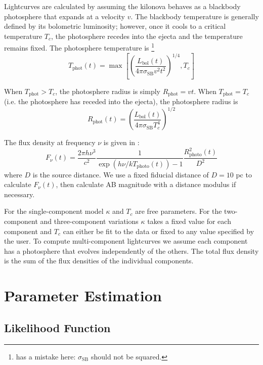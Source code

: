 \documentclass{article}
\begin{document}
Lightcurves are calculated by assuming the kilonova behaves as a blackbody photosphere that expands at a velocity $v$.
The blackbody temperature is generally defined by its bolometric luminosity; however, once it cools to a critical temperature $T_c$, the photosphere recedes into the ejecta and the temperature remains fixed.
The photosphere temperature is
\footnote{\cite{Villar_2017} has a mistake here: $\sigma_\text{SB}$ should not be squared.}
\begin{equation} \label{T_c}
    T_\text{phot}(t) = \max \left [ \left ( \frac {L_\text{bol}(t)} {4 \pi \sigma_\text{SB} v^2 t^2} \right )^{1/4}, T_c \right]
\end{equation}

When $T_\text{phot} > T_c$, the photosphere radius is simply $R_\text{phot} = v t$.
When $T_\text{phot} = T_c$ (i.e. the photosphere has receded into the ejecta), the photosphere radius is
\begin{equation}
    R_\text{phot}(t) = \left ( \frac {L_\text{bol}(t)} {4 \pi \sigma_\text{SB} T_c^4} \right )^{1/2}
\end{equation}

The flux density at frequency $\nu$ is given in \cite{Metzger_2017}:
\begin{equation}
    F_\nu(t) = \frac {2 \pi h \nu^3} {c^2} \frac {1} {\exp{(h \nu / k T_\text{photo}(t))} - 1} \frac {R_\text{photo}^2(t)} {D^2}
\end{equation}
where $D$ is the source distance.
We use a fixed fiducial distance of $D = 10$ pc to calculate $F_\nu(t)$, then calculate AB magnitude with a distance modulus if necessary.

For the single-component model $\kappa$ and $T_c$ are free parameters.
For the two-component and three-component variations $\kappa$ takes a fixed value for each component and $T_c$ can either be fit to the data or fixed to any value specified by the user.
To compute multi-component lightcurves we assume each component has a photosphere that evolves independently of the others.
The total flux density is the sum of the flux densities of the individual components.

\section{Parameter Estimation}

\subsection{Likelihood Function}
\end{document}
